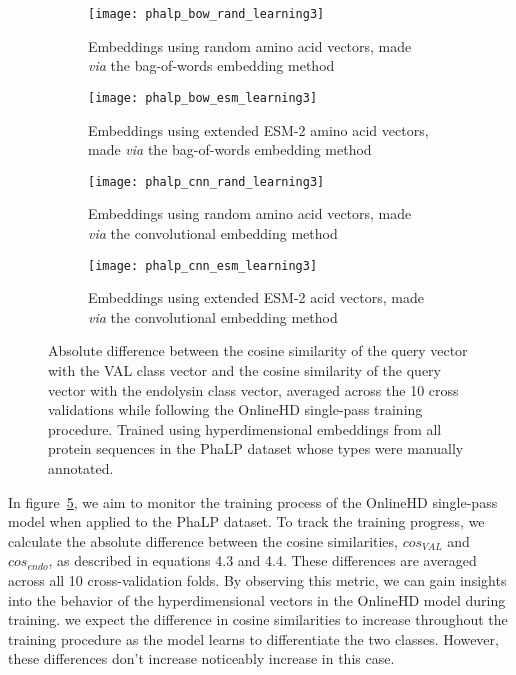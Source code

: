 \begin{figure}[h!]
    \centering
    \begin{subfigure}{0.48\textwidth}
        \texttt{[image: phalp\_bow\_rand\_learning3]}
        \caption{Embeddings using random amino acid vectors, made \textit{via} the bag-of-words embedding method}
        \label{fig:subfig-a2}
    \end{subfigure}
    \hfill
    \begin{subfigure}{0.48\textwidth}
        \texttt{[image: phalp\_bow\_esm\_learning3]}
        \caption{Embeddings using extended ESM-2 amino acid vectors, made \textit{via} the bag-of-words embedding method}
        \label{fig:subfig-b2}
    \end{subfigure}
    
    \begin{subfigure}{0.48\textwidth}
        \texttt{[image: phalp\_cnn\_rand\_learning3]}
        \caption{Embeddings using random amino acid vectors, made \textit{via} the convolutional embedding method}
        \label{fig:subfig-c2}
    \end{subfigure}
    \hfill
    \begin{subfigure}{0.48\textwidth}
        \texttt{[image: phalp\_cnn\_esm\_learning3]}
        \caption{Embeddings using extended ESM-2 acid vectors, made \textit{via} the convolutional embedding method}
        \label{fig:subfig-d2}
    \end{subfigure}
    \caption{Absolute difference between the cosine similarity of the query vector with the VAL class vector and the cosine similarity of the query vector with the endolysin class vector, averaged across the 10 cross validations while following the OnlineHD single-pass training procedure. Trained using hyperdimensional embeddings from all protein sequences in the PhaLP dataset whose types were manually annotated.}
    \label{fig:main2}
\end{figure}

In figure~\ref{fig:main2}, we aim to monitor the training process of the OnlineHD single-pass model when applied to the PhaLP dataset. To track the training progress, we calculate the absolute difference between the cosine similarities, $cos_{VAL}$ and $cos_{endo}$, as described in equations 4.3 and 4.4. These differences are averaged across all 10 cross-validation folds. By observing this metric, we can gain insights into the behavior of the hyperdimensional vectors in the OnlineHD model during training. we expect the difference in cosine similarities to increase throughout the training procedure as the model learns to differentiate the two classes. However, these differences don't increase noticeably increase in this case.


